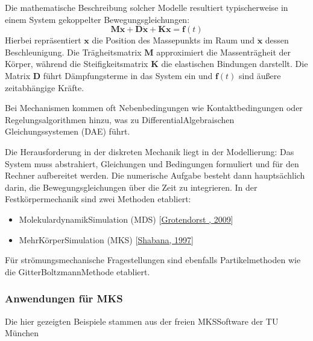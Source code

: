 \documentclass[letterpaper,10pt,german]{jupyterBook}
\begin{document}
\sphinxAtStartPar
Die mathematische Beschreibung solcher Modelle resultiert typischerweise in einem System gekoppelter Bewegungsgleichungen:
\label{equation:chapters/chapter1/Einführung_Modellklassifikation:cd52db9e-b60d-4e17-ab6c-210a48f5eb7b}\begin{equation}
\boldsymbol{M} \ddot{\boldsymbol{x}} + \boldsymbol{D} \dot{\boldsymbol{x}} + \boldsymbol{K} \boldsymbol{x} = \boldsymbol{f}(t)
\end{equation}
\sphinxAtStartPar
Hierbei repräsentiert \(\boldsymbol{x}\) die Position des Massepunkts im Raum und \(\ddot{\boldsymbol{x}}\) dessen Beschleunigung. Die Trägheitsmatrix \(\boldsymbol{M}\) approximiert die Massenträgheit der Körper, während die Steifigkeitsmatrix \(\boldsymbol{K}\) die elastischen Bindungen darstellt. Die Matrix \(\boldsymbol{D}\) führt Dämpfungsterme in das System ein und \(\boldsymbol{f}(t)\) sind äußere zeitabhängige Kräfte.

\sphinxAtStartPar
Bei Mechanismen kommen oft Nebenbedingungen wie Kontaktbedingungen oder Regelungsalgorithmen hinzu, was zu Differential\sphinxhyphen{}Algebraischen Gleichungssystemen (DAE) führt.

\sphinxAtStartPar
Die Herausforderung in der diskreten Mechanik liegt in der Modellierung: Das System muss abstrahiert, Gleichungen und Bedingungen formuliert und für den Rechner aufbereitet werden. Die numerische Aufgabe besteht dann hauptsächlich darin, die Bewegungsgleichungen über die Zeit zu integrieren. In der Festkörpermechanik sind zwei Methoden etabliert:
\begin{itemize}
\item {} 
\sphinxAtStartPar
Molekulardynamik\sphinxhyphen{}Simulation (MDS) {[}\hyperlink{cite.quellen:id5}{Grotendorst , 2009}{]}

\item {} 
\sphinxAtStartPar
Mehr\sphinxhyphen{}Körper\sphinxhyphen{}Simulation (MKS) {[}\hyperlink{cite.quellen:id6}{Shabana, 1997}{]}

\end{itemize}

\sphinxAtStartPar
Für strömungsmechanische Fragestellungen sind ebenfalls Partikelmethoden wie die Gitter\sphinxhyphen{}Boltzmann\sphinxhyphen{}Methode etabliert.




\subsubsection{Anwendungen für MKS}
\label{\detokenize{chapters/chapter1/Einf_xfchrung_Modellklassifikation:anwendungen-fur-mks}}
\sphinxAtStartPar
Die hier gezeigten Beispiele stammen aus der freien MKS\sphinxhyphen{}Software der TU München 
\end{document}
